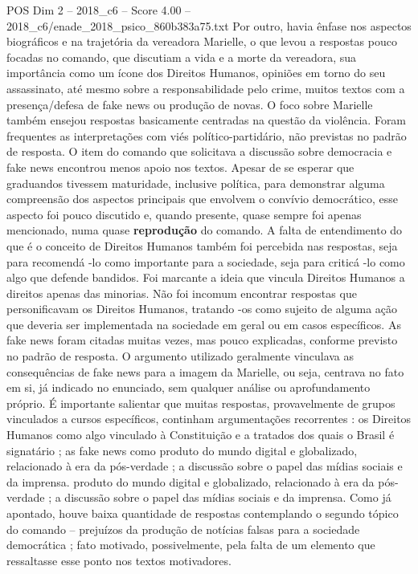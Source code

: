 \begin{textsample}{POS Dim 2 – 2018\_c6 – Score 4.00 – 2018\_c6/enade\_2018\_psico\_860b383a75.txt}
Por outro, havia ênfase nos aspectos biográficos e na trajetória da vereadora Marielle, o que levou a respostas pouco focadas no comando, que discutiam a vida e a morte da vereadora, sua importância como um ícone dos Direitos Humanos, opiniões em torno do seu assassinato, até mesmo sobre a responsabilidade pelo crime, muitos textos com a presença/defesa de fake news ou produção de novas.
O foco sobre Marielle também ensejou respostas basicamente centradas na questão da violência.
Foram frequentes as interpretações com viés político-partidário, não previstas no padrão de resposta.
O item do comando que solicitava a discussão sobre democracia e fake news encontrou menos apoio nos textos.
Apesar de se esperar que graduandos tivessem maturidade, inclusive política, para demonstrar alguma compreensão dos aspectos principais que envolvem o convívio democrático, esse aspecto foi pouco discutido e, quando presente, quase sempre foi apenas mencionado, numa quase \textbf{reprodução} do comando.
A falta de entendimento do que é o conceito de Direitos Humanos também foi percebida nas respostas, seja para recomendá -lo como importante para a sociedade, seja para criticá -lo como algo que defende bandidos.
Foi marcante a ideia que vincula Direitos Humanos a direitos apenas das minorias.
Não foi incomum encontrar respostas que personificavam os Direitos Humanos, tratando -os como sujeito de alguma ação que deveria ser implementada na sociedade em geral ou em casos específicos.
As fake news foram citadas muitas vezes, mas pouco explicadas, conforme previsto no padrão de resposta.
O argumento utilizado geralmente vinculava as consequências de fake news para a imagem da Marielle, ou seja, centrava no fato em si, já indicado no enunciado, sem qualquer análise ou aprofundamento próprio.
É importante salientar que muitas respostas, provavelmente de grupos vinculados a cursos específicos, continham argumentações recorrentes : os Direitos Humanos como algo vinculado à Constituição e a tratados dos quais o Brasil é signatário ; as fake news como produto do mundo digital e globalizado, relacionado à era da pós-verdade ; a discussão sobre o papel das mídias sociais e da imprensa. produto do mundo digital e globalizado, relacionado à era da pós-verdade ; a discussão sobre o papel das mídias sociais e da imprensa.
Como já apontado, houve baixa quantidade de respostas contemplando o segundo tópico do comando – prejuízos da produção de notícias falsas para a sociedade democrática ; fato motivado, possivelmente, pela falta de um elemento que ressaltasse esse ponto nos textos motivadores.

\end{textsample}
